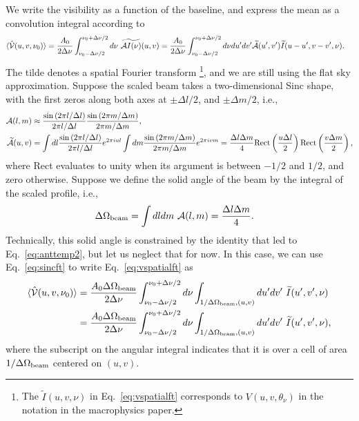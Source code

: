 \documentclass[11pt]{article}
\numberwithin{equation}{section}
\newcommand{\wt}[1]{\widetilde{#1}}
\begin{document}
We write the visibility as a function of the baseline, and express the mean as a convolution integral according to
\begin{align}
  \langle \hat{\cal V}(u, v, \nu_0) \rangle & = \frac{A_0}{2 \Delta \nu} \int_{\nu_0 - \Delta \nu/2}^{\nu_0 + \Delta \nu/2} d\nu \ \wt{{\cal A} I(\nu) }(u, v) = \frac{A_0}{2 \Delta \nu} \int_{\nu_0 - \Delta \nu/2}^{\nu_0 + \Delta \nu/2} d\nu du^\prime dv^\prime \wt{\cal A}(u^\prime, v^\prime) \wt{I}(u - u^\prime, v - v^\prime, \nu) \mbox{.} \label{eq:vspatialft}
\end{align}
The tilde denotes a spatial Fourier transform \footnote{The $\wt{I}(u, v, \nu)$ in Eq.~\eqref{eq:vspatialft} corresponds to $V(u,v,\theta_\nu)$ in the notation in the macrophysics paper.}, and we are still using the flat sky approximation. Suppose the scaled beam takes a two-dimensional Sinc shape, with the first zeros along both axes at $\pm \Delta l/2$, and $\pm \Delta m/2$, i.e.,
\begin{align}
  {\cal A}(l, m) & \approx \frac{\sin{(2\pi l/\Delta l)}}{2\pi l/\Delta l} \frac{\sin{(2\pi m/\Delta m)}}{2\pi m/\Delta m} \mbox{,} \\
  \wt{\cal A}(u, v) & = \int dl \frac{\sin{(2\pi l/\Delta l)}}{2\pi l/\Delta l} e^{ 2\pi i u l} \int dm \frac{\sin{(2\pi m/\Delta m)}}{2\pi m/\Delta m} e^{ 2\pi i v m} = \frac{\Delta l \Delta m}{4} {\rm Rect}\left( \frac{u \Delta l}{2} \right) {\rm Rect}\left( \frac{v \Delta m}{2} \right) \mbox{,} \label{eq:sincft}
\end{align}
where Rect evaluates to unity when its argument is between $-1/2$ and $1/2$, and zero otherwise. Suppose we define the solid angle of the beam by the integral of the scaled profile, i.e.,
\begin{align}
  \Delta \Omega_{\rm beam} & = \int dl dm \ {\cal A}(l, m) = \frac{\Delta l \Delta m}{4} \mbox{.}
\end{align}
Technically, this solid angle is constrained by the identity that led to Eq.~\eqref{eq:anttemp2}, but let us neglect that for now. In this case, we can use Eq.~\eqref{eq:sincft} to write Eq.~\eqref{eq:vspatialft} as
\begin{align}
  \langle \hat{\cal V}(u, v, \nu_0) \rangle & = \frac{A_0 \Delta \Omega_{\rm beam}}{2 \Delta \nu} \int_{\nu_0 - \Delta \nu/2}^{\nu_0 + \Delta \nu/2} d\nu \int_{1/\Delta \Omega_{\rm beam},(u,v)} du^\prime dv^\prime \ \wt{I}(u^\prime, v^\prime, \nu) \\
  & = \frac{A_0 \Delta \Omega_{\rm beam}}{2 \Delta \nu} \int_{\nu_0 - \Delta \nu/2}^{\nu_0 + \Delta \nu/2} d\nu \int_{1/\Delta \Omega_{\rm beam},(u,v)} du^\prime dv^\prime \ \wt{I}(u^\prime, v^\prime, \nu) \mbox{,} \label{eq:visdiscretize}
\end{align}
where the subscript on the angular integral indicates that it is over a cell of area $1/\Delta \Omega_{\rm beam}$ centered on $(u,v)$. 
\end{document}

